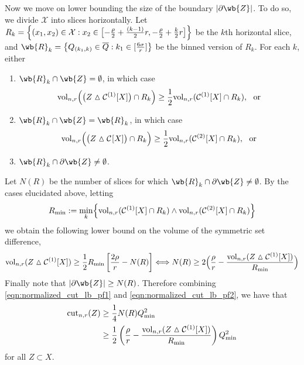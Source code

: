 	Now we move on lower bounding the size of the boundary $\abs{\partial\wb{Z}}$. To do so, we divide $\mathcal{X}$ into slices horizontally. Let $R_k = \left\{(x_1,x_2) \in \mathcal{X}: x_2 \in \bigl[-\frac{\rho}{2} + \frac{(k - 1)}{2}r, -\frac{\rho}{2} + \frac{k}{2}r\bigr]\right\}$ be the $k$th horizontal slice, and $\wb{R}_k = \set{Q_{(k_1,k)} \in \overline{Q}:k_1 \in [\frac{6\sigma}{r}]}$ be the binned version of $R_k$. For each $k$, either
	\begin{enumerate}
		\item $\wb{R}_k \cap \wb{Z} = \emptyset$, in which case
		\begin{equation*}
		\mathrm{vol}_{n,r}\Bigl( \bigl(Z \vartriangle \mathcal{C}^{(1)}[X]\bigr) \cap R_k \Bigr) \geq \frac{1}{2}\mathrm{vol}_{n,r}(\mathcal{C}^{(1)}[X] \cap R_k), ~~ \textrm{or}
		\end{equation*}
		\item $\wb{R}_k \cap \wb{Z} = \wb{R}_k$, in which case
		\begin{equation*}
		\mathrm{vol}_{n,r}\Bigl( \bigl(Z \vartriangle \mathcal{C}^{}[X]\bigr) \cap R_k \Bigr) \geq \frac{1}{2}\mathrm{vol}_{n,r}(\mathcal{C}^{(2)}[X] \cap R_k), ~~\textrm{or}
		\end{equation*}
		\item $\wb{R}_k \cap \partial \wb{Z} \neq \emptyset$.
	\end{enumerate}
	Let $N(R)$ be the number of slices for which $\wb{R}_k \cap \partial \wb{Z} \neq \emptyset$. By the cases elucidated above, letting
	\begin{equation*} 
	R_{\min} := \min_{k}\Bigl\{\mathrm{vol}_{n,r}(\mathcal{C}^{(1)}[X] \cap R_k) \wedge \mathrm{vol}_{n,r}(\mathcal{C}^{(2)}[X] \cap R_k)\Bigr\}
	\end{equation*} 
	we obtain the following lower bound on the volume of the symmetric set difference,
	\begin{equation}
	\label{eqn:normalized_cut_lb_pf2}
	\mathrm{vol}_{n,r}(Z \vartriangle \mathcal{C}^{(1)}[X]) \geq \frac{1}{2} R_{\min}  \left[\frac{2\rho}{r} - N(R)\right] \Longleftrightarrow N(R) \geq 2\Bigl(\frac{\rho}{r} - \frac{\mathrm{vol}_{n,r}(Z \vartriangle \mathcal{C}^{(1)}[X])}{R_{\min}}\Bigr)
	\end{equation}
	Finally note that $\abs{\partial\wb{Z}} \geq N(R)$. Therefore combining \eqref{eqn:normalized_cut_lb_pf1} and \eqref{eqn:normalized_cut_lb_pf2}, we have that
	\begin{align}
	\mathrm{cut}_{n,r}(Z) & \geq \frac{1}{4}N(R) Q_{\min}^2 \nonumber \\
	& \geq \frac{1}{2}\left(\frac{\rho}{r} - \frac{\mathrm{vol}_{n,r}(Z \vartriangle \mathcal{C}^{(1)}[X])}{R_{\min}}\right) Q_{\min}^2 \label{eqn:normalized_cut_lb_pf3}
	\end{align}
	for all $Z \subset X$.
	
